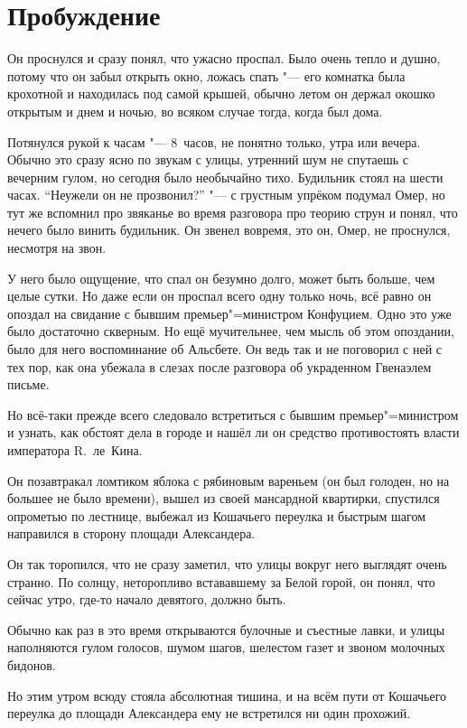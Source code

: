 \section{Пробуждение}

Он проснулся и сразу понял, что ужасно проспал.
Было очень тепло и душно, потому что он забыл открыть окно, ложась спать "---
его комнатка была крохотной и находилась под самой крышей, обычно летом он
держал окошко открытым и днем и ночью, во всяком случае тогда, когда был дома.

Потянулся рукой к часам "--- 8~часов, не понятно только, утра или вечера.
Обычно это сразу ясно по звукам с улицы, утренний шум не спутаешь с вечерним
гулом, но сегодня было необычайно тихо.
Будильник стоял на шести часах.
\enquote{Неужели он не прозвонил?} "--- с грустным упрёком подумал Омер, но тут
же вспомнил про звяканье во время разговора про теорию струн и понял, что нечего
было винить будильник.
Он звенел вовремя, это он, Омер, не проснулся, несмотря на звон.

У него было ощущение, что спал он безумно долго, может быть больше, чем целые
сутки.
Но даже если он проспал всего одну только ночь, всё равно он опоздал на свидание
с бывшим премьер"=министром Конфуцием.
Одно это уже было достаточно скверным.
Но ещё мучительнее, чем мысль об этом опоздании, было для него воспоминание об
Альсбете.
Он ведь так и не поговорил с ней с тех пор, как она убежала в слезах после
разговора об украденном Гвенаэлем письме.

Но всё-таки прежде всего следовало встретиться с бывшим премьер"=министром и
узнать, как обстоят дела в городе и нашёл ли он средство противостоять власти
императора R.~ле~Кина.

Он позавтракал ломтиком яблока с рябиновым вареньем (он был голоден, но на
большее не было времени), вышел из своей мансардной квартирки, спустился
опрометью по лестнице, выбежал из Кошачьего переулка и быстрым шагом направился
в сторону площади Александера.

Он так торопился, что не сразу заметил, что улицы вокруг него выглядят очень
странно.
По солнцу, неторопливо встававшему за Белой горой, он понял, что сейчас утро,
где-то начало девятого, должно быть.

Обычно как раз в это время открываются булочные и съестные лавки, и улицы
наполняются гулом голосов, шумом шагов, шелестом газет и звоном молочных бидонов.

Но этим утром всюду стояла абсолютная тишина, и на всём пути от Кошачьего
переулка до площади Александера ему не встретился ни один прохожий.


